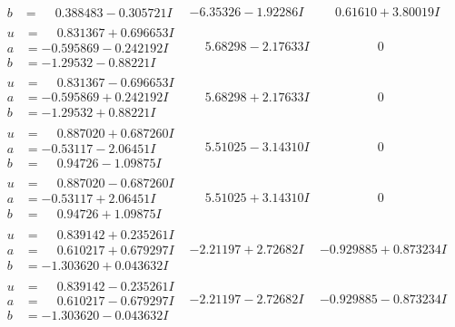 \documentclass[1p]{elsarticle_modified}
\theoremstyle{definition}
\begin{document}
$$\begin{array}{c|c|c}
\begin{aligned}
b &= \phantom{-}0.388483 - 0.305721 I\end{aligned}
 & -6.35326 - 1.92286 I & \phantom{-}0.61610 + 3.80019 I \\ \hline\begin{aligned}
u &= \phantom{-}0.831367 + 0.696653 I \\
a &= -0.595869 - 0.242192 I \\
b &= -1.29532 - 0.88221 I\end{aligned}
 & \phantom{-}5.68298 - 2.17633 I & \phantom{-0.000000 } 0 \\ \hline\begin{aligned}
u &= \phantom{-}0.831367 - 0.696653 I \\
a &= -0.595869 + 0.242192 I \\
b &= -1.29532 + 0.88221 I\end{aligned}
 & \phantom{-}5.68298 + 2.17633 I & \phantom{-0.000000 } 0 \\ \hline\begin{aligned}
u &= \phantom{-}0.887020 + 0.687260 I \\
a &= -0.53117 - 2.06451 I \\
b &= \phantom{-}0.94726 - 1.09875 I\end{aligned}
 & \phantom{-}5.51025 - 3.14310 I & \phantom{-0.000000 } 0 \\ \hline\begin{aligned}
u &= \phantom{-}0.887020 - 0.687260 I \\
a &= -0.53117 + 2.06451 I \\
b &= \phantom{-}0.94726 + 1.09875 I\end{aligned}
 & \phantom{-}5.51025 + 3.14310 I & \phantom{-0.000000 } 0 \\ \hline\begin{aligned}
u &= \phantom{-}0.839142 + 0.235261 I \\
a &= \phantom{-}0.610217 + 0.679297 I \\
b &= -1.303620 + 0.043632 I\end{aligned}
 & -2.21197 + 2.72682 I & -0.929885 + 0.873234 I \\ \hline\begin{aligned}
u &= \phantom{-}0.839142 - 0.235261 I \\
a &= \phantom{-}0.610217 - 0.679297 I \\
b &= -1.303620 - 0.043632 I\end{aligned}
 & -2.21197 - 2.72682 I & -0.929885 - 0.873234 I \\ \hline\begin{aligned}

\end{aligned}
\end{array}$$
\end{document}
